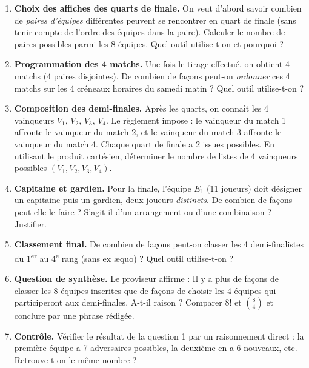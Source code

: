 \documentclass[11pt]{article}
\newcommand{\cle}[1]{{\popxbold\color{popdark}#1}}
\newcounter{popsec}
\newcounter{popsub}
\newcommand{\courssub}[1]{%
  \stepcounter{popsub}%
  \par\vspace{9pt}\noindent{\popxbold\fontsize{11.5}{13}\selectfont\color{popink}{\color{poporange}\thepopsec.\thepopsub}\hspace{6pt}#1}\par\nopagebreak\vspace{4pt}
}
\begin{document}
\begin{enumerate}
\item \textbf{Choix des affiches des quarts de finale.} On veut d'abord savoir combien de \emph{paires d'équipes} différentes peuvent se rencontrer en quart de finale (sans tenir compte de l'ordre des équipes dans la paire). Calculer le nombre de paires possibles parmi les 8 équipes. Quel outil utilise-t-on et pourquoi ?
\item \textbf{Programmation des 4 matchs.} Une fois le tirage effectué, on obtient 4 matchs (4 paires disjointes). De combien de façons peut-on \emph{ordonner} ces 4 matchs sur les 4 créneaux horaires du samedi matin ? Quel outil utilise-t-on ?
\item \textbf{Composition des demi-finales.} Après les quarts, on connaît les 4 vainqueurs $V_1$, $V_2$, $V_3$, $V_4$. Le règlement impose : le vainqueur du match 1 affronte le vainqueur du match 2, et le vainqueur du match 3 affronte le vainqueur du match 4. Chaque quart de finale a 2 issues possibles. En utilisant le \cle{produit cartésien}, déterminer le nombre de listes de 4 vainqueurs possibles $(V_1, V_2, V_3, V_4)$.
\item \textbf{Capitaine et gardien.} Pour la finale, l'équipe $E_1$ (11 joueurs) doit désigner un capitaine puis un gardien, deux joueurs \emph{distincts}. De combien de façons peut-elle le faire ? S'agit-il d'un arrangement ou d'une combinaison ? Justifier.
\item \textbf{Classement final.} De combien de façons peut-on classer les 4 demi-finalistes du 1\textsuperscript{er} au 4\textsuperscript{e} rang (sans ex æquo) ? Quel outil utilise-t-on ?
\item \textbf{Question de synthèse.} Le proviseur affirme : \og Il y a plus de façons de classer les 8 équipes inscrites que de façons de choisir les 4 équipes qui participeront aux demi-finales. \fg A-t-il raison ? Comparer $8!$ et $\binom{8}{4}$ et conclure par une phrase rédigée.
\item \textbf{Contrôle.} Vérifier le résultat de la question 1 par un raisonnement direct : la première équipe a 7 adversaires possibles, la deuxième en a 6 nouveaux, etc. Retrouve-t-on le même nombre ?
\end{enumerate}

\courssub{Ressources à mobiliser}
\end{document}
